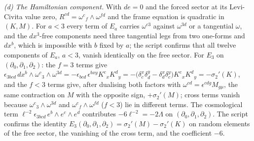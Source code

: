 \emph{(d) The Hamiltonian component.} With $de = 0$ and the forced sector at its Levi-Civita value zero, $R^{cd} = \omega^{c}{}_{f}\wedge\omega^{fd}$ and the frame equation is quadratic in $(K, M)$. For $a < 3$ every term of $E_a$ carries $\omega^{c3}$ against $\omega^{3d}$ or a tangential $\omega$, and the $dx^3$-free components need three tangential legs from two one-forms and $dx^b$, which is impossible with $b$ fixed by $a$; the script confirms that all twelve components of $E_a$, $a<3$, vanish identically on the free sector. For $E_3$ on $(\partial_0,\partial_1,\partial_2)$: the $f = 3$ terms give $\epsilon_{3bcd}\,dx^b\wedge\omega^{c}{}_{3}\wedge\omega^{3d} = -\epsilon_{bcd}\,\epsilon^{bxy}K^{c}{}_{x}K^{d}{}_{y} = -\bigl(\delta^x_c\delta^y_d - \delta^x_d\delta^y_c\bigr)K^{c}{}_{x}K^{d}{}_{y} = -\sigma_2'(K)$, and the $f < 3$ terms give, after dualising both factors with $\omega^{cd} = \epsilon^{cdg}M_{g\mu}$, the same contraction on $M$ with the opposite sign, $+\sigma_2'(M)$; cross terms vanish because $\omega^{c}{}_{3}\wedge\omega^{3d}$ and $\omega^{c}{}_{f}\wedge\omega^{fd}$ ($f<3$) lie in different terms. The cosmological term $\ell^{-2}\epsilon_{3bcd}\,e^b\wedge e^c\wedge e^d$ contributes $-6\ell^{-2} = -2\Lambda$ on $(\partial_0,\partial_1,\partial_2)$. The script confirms the identity $E_3(\partial_0,\partial_1,\partial_2) = \sigma_2'(M) - \sigma_2'(K)$ on random elements of the free sector, the vanishing of the cross term, and the coefficient $-6$.
